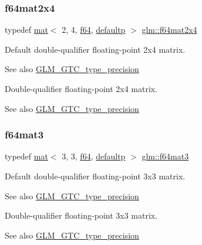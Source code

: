 \subsubsection{\texorpdfstring{f64mat2x4}{f64mat2x4}}
{\footnotesize\ttfamily typedef \hyperlink{structglm_1_1mat}{mat}$<$ 2, 4, \hyperlink{group__gtc__type__precision_ga2bba392e555124b36cde6abba349bab3}{f64}, \hyperlink{namespaceglm_a36ed105b07c7746804d7fdc7cc90ff25a9d21ccd8b5a009ec7eb7677befc3bf51}{defaultp} $>$ \hyperlink{group__gtc__type__precision_gae075a2083e1801ada5c99c91f79eb6ed}{glm\+::f64mat2x4}}

Default double-\/qualifier floating-\/point 2x4 matrix. \begin{DoxySeeAlso}{See also}
\hyperlink{group__gtc__type__precision}{G\+L\+M\+\_\+\+G\+T\+C\+\_\+type\+\_\+precision}
\end{DoxySeeAlso}
Double-\/qualifier floating-\/point 2x4 matrix. \begin{DoxySeeAlso}{See also}
\hyperlink{group__gtc__type__precision}{G\+L\+M\+\_\+\+G\+T\+C\+\_\+type\+\_\+precision} 
\end{DoxySeeAlso}
\mbox{\label{group__gtc__type__precision_ga44a41778554076393a2c59a98fe5128e}} 
\subsubsection{\texorpdfstring{f64mat3}{f64mat3}}
{\footnotesize\ttfamily typedef \hyperlink{structglm_1_1mat}{mat}$<$ 3, 3, \hyperlink{group__gtc__type__precision_ga2bba392e555124b36cde6abba349bab3}{f64}, \hyperlink{namespaceglm_a36ed105b07c7746804d7fdc7cc90ff25a9d21ccd8b5a009ec7eb7677befc3bf51}{defaultp} $>$ \hyperlink{group__gtc__type__precision_ga44a41778554076393a2c59a98fe5128e}{glm\+::f64mat3}}

Default double-\/qualifier floating-\/point 3x3 matrix. \begin{DoxySeeAlso}{See also}
\hyperlink{group__gtc__type__precision}{G\+L\+M\+\_\+\+G\+T\+C\+\_\+type\+\_\+precision}
\end{DoxySeeAlso}
Double-\/qualifier floating-\/point 3x3 matrix. \begin{DoxySeeAlso}{See also}
\hyperlink{group__gtc__type__precision}{G\+L\+M\+\_\+\+G\+T\+C\+\_\+type\+\_\+precision} 
\end{DoxySeeAlso}
\mbox{\label{group__gtc__type__precision_ga311a3bf48bfe2c95150e9f71db9063c5}} 
